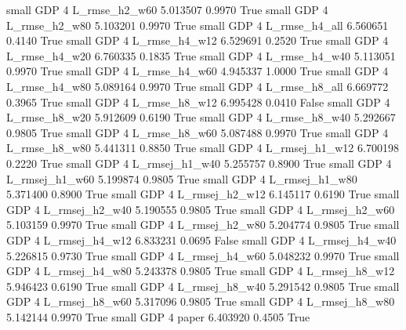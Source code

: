      small      GDP                 4  L_rmse_h2_w60   5.013507      0.9970    True
     small      GDP                 4  L_rmse_h2_w80   5.103201      0.9970    True
     small      GDP                 4  L_rmse_h4_all   6.560651      0.4140    True
     small      GDP                 4  L_rmse_h4_w12   6.529691      0.2520    True
     small      GDP                 4  L_rmse_h4_w20   6.760335      0.1835    True
     small      GDP                 4  L_rmse_h4_w40   5.113051      0.9970    True
     small      GDP                 4  L_rmse_h4_w60   4.945337      1.0000    True
     small      GDP                 4  L_rmse_h4_w80   5.089164      0.9970    True
     small      GDP                 4  L_rmse_h8_all   6.669772      0.3965    True
     small      GDP                 4  L_rmse_h8_w12   6.995428      0.0410   False
     small      GDP                 4  L_rmse_h8_w20   5.912609      0.6190    True
     small      GDP                 4  L_rmse_h8_w40   5.292667      0.9805    True
     small      GDP                 4  L_rmse_h8_w60   5.087488      0.9970    True
     small      GDP                 4  L_rmse_h8_w80   5.441311      0.8850    True
     small      GDP                 4 L_rmsej_h1_w12   6.700198      0.2220    True
     small      GDP                 4 L_rmsej_h1_w40   5.255757      0.8900    True
     small      GDP                 4 L_rmsej_h1_w60   5.199874      0.9805    True
     small      GDP                 4 L_rmsej_h1_w80   5.371400      0.8900    True
     small      GDP                 4 L_rmsej_h2_w12   6.145117      0.6190    True
     small      GDP                 4 L_rmsej_h2_w40   5.190555      0.9805    True
     small      GDP                 4 L_rmsej_h2_w60   5.103159      0.9970    True
     small      GDP                 4 L_rmsej_h2_w80   5.204774      0.9805    True
     small      GDP                 4 L_rmsej_h4_w12   6.833231      0.0695   False
     small      GDP                 4 L_rmsej_h4_w40   5.226815      0.9730    True
     small      GDP                 4 L_rmsej_h4_w60   5.048232      0.9970    True
     small      GDP                 4 L_rmsej_h4_w80   5.243378      0.9805    True
     small      GDP                 4 L_rmsej_h8_w12   5.946423      0.6190    True
     small      GDP                 4 L_rmsej_h8_w40   5.291542      0.9805    True
     small      GDP                 4 L_rmsej_h8_w60   5.317096      0.9805    True
     small      GDP                 4 L_rmsej_h8_w80   5.142144      0.9970    True
     small      GDP                 4          paper   6.403920      0.4505    True

